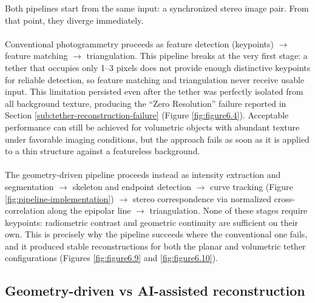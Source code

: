 Both pipelines start from the same input: a synchronized stereo image pair. From that point, they diverge immediately.
\\\\
Conventional photogrammetry proceeds as feature detection (keypoints) $\rightarrow$ feature matching $\rightarrow$ triangulation. This pipeline breaks at the very first stage: a tether that occupies only 1--3 pixels does not provide enough distinctive keypoints for reliable detection, so feature matching and triangulation never receive usable input. This limitation persisted even after the tether was perfectly isolated from all background texture, producing the ``Zero Resolution'' failure reported in Section \ref{sub:tether-reconstruction-failure} (Figure \ref{fig:figure6.4}). Acceptable performance can still be achieved for volumetric objects with abundant texture under favorable imaging conditions, but the approach fails as soon as it is applied to a thin structure against a featureless background.
\\\\
The geometry-driven pipeline proceeds instead as intensity extraction and segmentation $\rightarrow$ skeleton and endpoint detection $\rightarrow$ curve tracking (Figure \ref{fig:pipeline-implementation}) $\rightarrow$ stereo correspondence via normalized cross-correlation along the epipolar line $\rightarrow$ triangulation. None of these stages require keypoints: radiometric contrast and geometric continuity are sufficient on their own. This is precisely why the pipeline succeeds where the conventional one fails, and it produced stable reconstructions for both the planar and volumetric tether configurations (Figures \ref{fig:figure6.9} and \ref{fig:figure6.10}).
\newpage
\clearpage

\subsection{Geometry-driven vs AI-assisted reconstruction}


